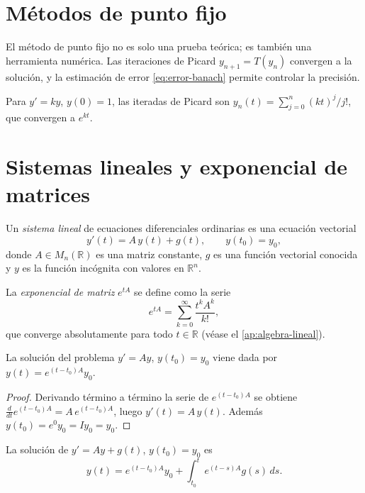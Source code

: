 \section{Métodos de punto fijo}

El método de punto fijo no es solo una prueba teórica; es también una herramienta numérica. Las iteraciones de Picard $y_{n+1}=T(y_n)$ convergen a la solución, y la estimación de error \eqref{eq:error-banach} permite controlar la precisión.

\begin{example}
\label{ej:picard-lineal}
Para $y'=ky$, $y(0)=1$, las iteradas de Picard son $y_n(t)=\sum_{j=0}^{n}(kt)^j/j!$, que convergen a $e^{kt}$.
\end{example}

\section{Sistemas lineales y exponencial de matrices}

\begin{definition}
\label{def:sistema-lineal}
Un \emph{sistema lineal} de ecuaciones diferenciales ordinarias es una ecuación vectorial
\[
  y'(t)=A\,y(t)+g(t),\qquad y(t_0)=y_0,
\]
donde $A\in M_n(\mathbb{R})$ es una matriz constante, $g$ es una función vectorial conocida y $y$ es la función incógnita con valores en $\mathbb{R}^n$.
\end{definition}

\begin{definition}
\label{def:exponencial-matriz-edo}
La \emph{exponencial de matriz} $e^{tA}$ se define como la serie
\[
  e^{tA}=\sum_{k=0}^{\infty}\frac{t^k A^k}{k!},
\]
que converge absolutamente para todo $t\in\mathbb{R}$ (véase el \cref{ap:algebra-lineal}).
\end{definition}

\begin{theorem}
\label{teo:solucion-lineal}
La solución del problema $y'=Ay$, $y(t_0)=y_0$ viene dada por $y(t)=e^{(t-t_0)A}y_0$.
\end{theorem}
\begin{proof}
Derivando término a término la serie de $e^{(t-t_0)A}$ se obtiene $\frac{d}{dt}e^{(t-t_0)A}=A\,e^{(t-t_0)A}$, luego $y'(t)=A\,y(t)$. Además $y(t_0)=e^{0}y_0=I y_0=y_0$.
\end{proof}

\begin{theorem}
\label{teo:variacion-parametros}
La solución de $y'=Ay+g(t)$, $y(t_0)=y_0$ es
\[
  y(t)=e^{(t-t_0)A}y_0+\int_{t_0}^{t}e^{(t-s)A}g(s)\,ds.
\]
\end{theorem}

